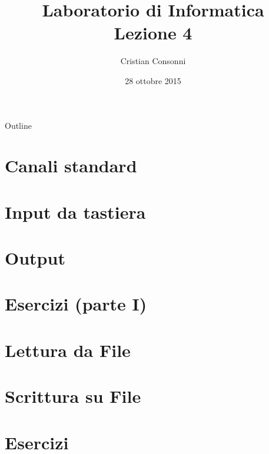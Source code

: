 \documentclass[10pt]{beamer}
\title[Laboratorio di Informatica - Lezione 4]{Laboratorio di Informatica \\ Lezione 4}
\author[Cristian Consonni]{Cristian Consonni}
\date[28/10/2015]{28 ottobre 2015}
\institute[UniTN]{Università degli Studi di Trento}
\begin{document}
\begin{frame}
  \titlepage
\end{frame}

\begin{frame}{Outline}
  \tableofcontents
\end{frame}



\section{Canali standard}


\section{Input da tastiera}


\section{Output}


\section{Esercizi (parte I)}


\section{Lettura da File}


\section{Scrittura su File}


\section{Esercizi}


% 
\end{document}
